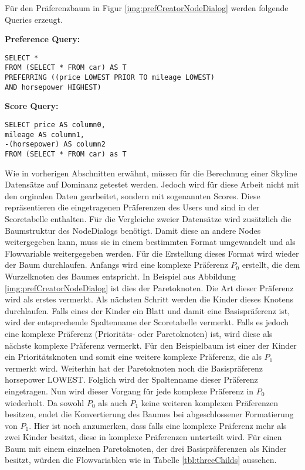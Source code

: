 Für den Präferenzbaum in Figur \ref{img:prefCreatorNodeDialog} werden folgende Queries erzeugt.

\textbf{Preference Query:}
\begin{verbatim}
SELECT * 
FROM (SELECT * FROM car) AS T 
PREFERRING ((price LOWEST PRIOR TO mileage LOWEST) 
AND horsepower HIGHEST)
\end{verbatim}

\textbf{Score Query:}
\begin{verbatim}
SELECT price AS column0,
mileage AS column1,
-(horsepower) AS column2 
FROM (SELECT * FROM car) as T
\end{verbatim}

Wie in vorherigen Abschnitten erwähnt, müssen für die Berechnung einer Skyline Datensätze auf Dominanz getestet werden. Jedoch wird für diese Arbeit nicht mit den orginalen Daten gearbeitet, sondern mit sogenannten Scores. Diese repräsentieren die eingetragenen Präferenzen des Users und sind in der Scoretabelle enthalten. Für die Vergleiche zweier Datensätze wird zusätzlich die Baumstruktur des NodeDialogs benötigt. Damit diese an andere Nodes weitergegeben kann, muss sie in einem bestimmten Format umgewandelt und als Flowvariable weitergegeben werden. 
Für die Erstellung dieses Format wird wieder der Baum durchlaufen. Anfangs wird eine komplexe Präferenz $P_0$ erstellt, die dem Wurzelknoten des Baumes entspricht. In Beispiel aus Abbildung \ref{img:prefCreatorNodeDialog} ist dies der Paretoknoten. Die Art dieser Präferenz wird als erstes vermerkt. Als nächsten Schritt werden die Kinder dieses Knotens durchlaufen. Falls eines der Kinder ein Blatt und damit eine Basispräferenz ist, wird der entsprechende Spaltenname der Scoretabelle vermerkt. Falls es jedoch eine komplexe Präferenz (Prioritäts- oder Paretoknoten) ist, wird diese als nächste komplexe Präferenz vermerkt. Für den Beispielbaum ist einer der Kinder ein Prioritätsknoten und somit eine weitere komplexe Präferenz, die als $P_1$ vermerkt wird. Weiterhin hat der Paretoknoten noch die Basispräferenz horsepower LOWEST. Folglich wird der Spaltenname dieser Präferenz eingetragen. Nun wird dieser Vorgang für jede komplexe Präferenz in $P_0$ wiederholt. Da sowohl $P_0$ als auch $P_1$ keine weiteren komplexen Präferenzen besitzen, endet die Konvertierung des Baumes bei abgeschlossener Formatierung von $P_1$.
Hier ist noch anzumerken, dass falls eine komplexe Präferenz mehr als zwei Kinder besitzt, diese in komplexe Präferenzen unterteilt wird. Für einen Baum mit einem einzelnen Paretoknoten, der drei Basispräferenzen als Kinder besitzt, würden die Flowvariablen wie in Tabelle \ref{tbl:threeChilds} aussehen.

